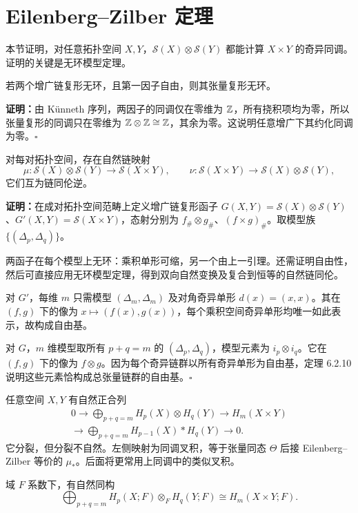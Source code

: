 \section{Eilenberg--Zilber 定理}
本节证明，对任意拓扑空间 $X,Y$，$\mathcal S(X)\otimes\mathcal S(Y)$ 都能计算 $X\times Y$ 的奇异同调。证明的关键是无环模型定理。

若两个增广链复形无环，且第一因子自由，则其张量复形无环。

\textbf{证明：}由 Künneth 序列，两因子的同调仅在零维为 $\mathbb{Z}$，所有挠积项均为零，所以张量复形的同调只在零维为 $\mathbb{Z}\otimes\mathbb{Z}\cong\mathbb{Z}$，其余为零。这说明任意增广下其约化同调为零。\hfill$\square$

对每对拓扑空间，存在自然链映射
\[
\mu:\mathcal S(X)\otimes\mathcal S(Y)\to\mathcal S(X\times Y),\qquad
\nu:\mathcal S(X\times Y)\to\mathcal S(X)\otimes\mathcal S(Y),
\]
它们互为链同伦逆。

\textbf{证明：}在成对拓扑空间范畴上定义增广链复形函子 $G(X,Y)=\mathcal S(X)\otimes\mathcal S(Y)$、$G'(X,Y)=\mathcal S(X\times Y)$，态射分别为 $f_\#\otimes g_\#$、$(f\times g)_\#$。取模型族 $\{(\Delta_p,\Delta_q)\}$。

两函子在每个模型上无环：乘积单形可缩，另一个由上一引理。还需证明自由性，然后可直接应用无环模型定理，得到双向自然变换及复合到恒等的自然链同伦。

对 $G'$，每维 $m$ 只需模型 $(\Delta_m,\Delta_m)$ 及对角奇异单形 $d(x)=(x,x)$。其在 $(f,g)$ 下的像为 $x\mapsto(f(x),g(x))$，每个乘积空间奇异单形均唯一如此表示，故构成自由基。

对 $G$，$m$ 维模型取所有 $p+q=m$ 的 $(\Delta_p,\Delta_q)$，模型元素为 $i_p\otimes i_q$。它在 $(f,g)$ 下的像为 $f\otimes g$。因为每个奇异链群以所有奇异单形为自由基，定理 6.2.10 说明这些元素恰构成总张量链群的自由基。\hfill$\square$

任意空间 $X,Y$ 有自然正合列
\[
\begin{split}
0\to\bigoplus_{p+q=m}H_p(X)\otimes H_q(Y)\to H_m(X\times Y)\\
\to\bigoplus_{p+q=m}H_{p-1}(X)*H_q(Y)\to0.
\end{split}
\]
它分裂，但分裂不自然。左侧映射为同调叉积，等于张量同态 $\Theta$ 后接 Eilenberg--Zilber 等价的 $\mu_*$。后面将更常用上同调中的类似叉积。

域 $F$ 系数下，有自然同构
\[
\bigoplus_{p+q=m}H_p(X;F)\otimes_FH_q(Y;F)\cong H_m(X\times Y;F).
\]

